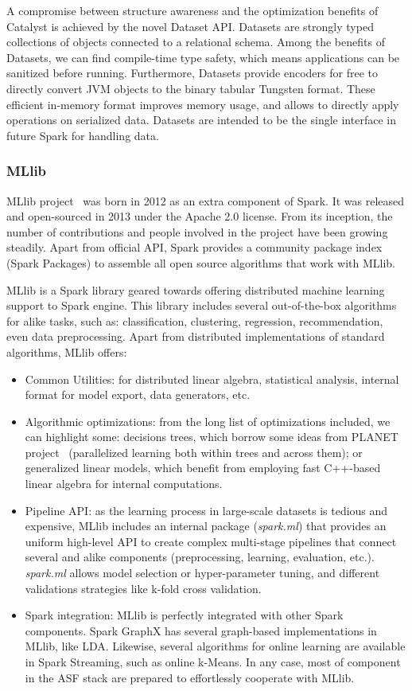 \documentclass[3p,review]{elsarticle}
\begin{document}
A compromise between structure awareness and the optimization benefits of Catalyst is achieved by the novel Dataset API. Datasets are strongly typed collections of objects connected to a relational schema. Among the benefits of Datasets, we can find compile-time type safety, which means applications can be sanitized before running. Furthermore, Datasets provide encoders for free to directly convert JVM objects to the binary tabular Tungsten format. These efficient in-memory format improves memory usage, and allows to directly apply operations on serialized data. Datasets are intended to be the single interface in future Spark for handling data.

\subsubsection{MLlib}


MLlib project~\cite{mllib15} was born in 2012 as an extra component of Spark. It was released and open-sourced in 2013 under the Apache 2.0 license. From its inception, the number of contributions and people involved in the project have been growing steadily. Apart from official API, Spark provides a community package index~\cite{sparkpackages} (Spark Packages) to assemble all open source algorithms that work with MLlib. 

MLlib is a Spark library geared towards offering distributed machine learning support to Spark engine. This library includes several out-of-the-box algorithms for alike tasks, such as: classification, clustering, regression, recommendation, even data preprocessing. Apart from distributed implementations of standard algorithms, MLlib offers:

\begin{itemize}
	\item Common Utilities: for distributed linear algebra, statistical analysis, internal format for model export, data generators, etc. 
	\item Algorithmic optimizations: from the long list of optimizations included, we can highlight some: decisions trees, which borrow some ideas from PLANET project~\cite{panda09} (parallelized learning both within trees and across them); or generalized linear models, which benefit from employing fast C++-based linear algebra for internal computations.
	\item Pipeline API: as the learning process in large-scale datasets is tedious and expensive, MLlib includes an internal package (\emph{spark.ml}) that provides an uniform high-level API to create complex multi-stage pipelines that connect several and alike components (preprocessing, learning, evaluation, etc.). \emph{spark.ml} allows model selection or hyper-parameter tuning, and different validations strategies like k-fold cross validation.
	\item Spark integration: MLlib is perfectly integrated with other Spark components. Spark GraphX has several graph-based implementations in MLlib, like LDA. Likewise, several algorithms for online learning are available in Spark Streaming, such as online k-Means. In any case, most of component in the ASF stack are prepared to effortlessly cooperate with MLlib.
\end{itemize}
\end{document}
